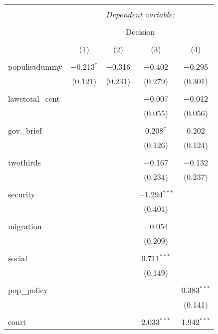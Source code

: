 
\begin{table}[!htbp] \centering 
  \caption{} 
  \label{} 
\begin{tabular}{@{\extracolsep{5pt}}lcccc} 
\\[-1.8ex]\hline 
\hline \\[-1.8ex] 
 & \multicolumn{4}{c}{\textit{Dependent variable:}} \\ 
\cline{2-5} 
\\[-1.8ex] & \multicolumn{4}{c}{Decision} \\ 
\\[-1.8ex] & (1) & (2) & (3) & (4)\\ 
\hline \\[-1.8ex] 
 populistdummy & $-$0.213$^{*}$ & $-$0.316 & $-$0.402 & $-$0.295 \\ 
  & (0.121) & (0.231) & (0.279) & (0.301) \\ 
  & & & & \\ 
 lawstotal\_cent &  &  & $-$0.007 & $-$0.012 \\ 
  &  &  & (0.055) & (0.056) \\ 
  & & & & \\ 
 gov\_brief &  &  & 0.208$^{*}$ & 0.202 \\ 
  &  &  & (0.126) & (0.124) \\ 
  & & & & \\ 
 twothirds &  &  & $-$0.167 & $-$0.132 \\ 
  &  &  & (0.234) & (0.237) \\ 
  & & & & \\ 
 security &  &  & $-$1.294$^{***}$ &  \\ 
  &  &  & (0.401) &  \\ 
  & & & & \\ 
 migration &  &  & $-$0.054 &  \\ 
  &  &  & (0.209) &  \\ 
  & & & & \\ 
 social &  &  & 0.711$^{***}$ &  \\ 
  &  &  & (0.149) &  \\ 
  & & & & \\ 
 pop\_policy &  &  &  & 0.383$^{***}$ \\ 
  &  &  &  & (0.141) \\ 
  & & & & \\ 
 court &  &  & 2.033$^{***}$ & 1.942$^{***}$ \\ 

\end{tabular}
\end{table}
